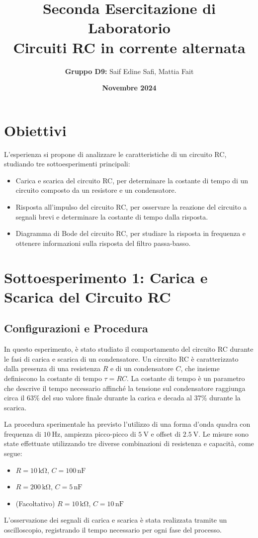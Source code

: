 \documentclass[a4paper,12pt]{article}
\title{\Large\textbf{Seconda Esercitazione di Laboratorio}\\ \vspace{0.5em} \large Circuiti RC in corrente alternata}
\author{\textbf{Gruppo D9:} Saif Edine Safi, Mattia Fait}
\date{\textbf{Novembre 2024}}
\begin{document}
\maketitle

\tableofcontents %
\newpage

\section{Obiettivi}
L'esperienza si propone di analizzare le caratteristiche di un circuito RC, studiando tre sottoesperimenti principali:
\begin{itemize}
    \item Carica e scarica del circuito RC, per determinare la costante di tempo di un circuito composto da un resistore e un condensatore.
    \item Risposta all'impulso del circuito RC, per osservare la reazione del circuito a segnali brevi e determinare la costante di tempo dalla risposta.
    \item Diagramma di Bode del circuito RC, per studiare la risposta in frequenza e ottenere informazioni sulla risposta del filtro passa-basso.
\end{itemize}


\section{Sottoesperimento 1: Carica e Scarica del Circuito RC}
\subsection{Configurazioni e Procedura}
In questo esperimento, è stato studiato il comportamento del circuito RC durante le fasi di carica e scarica di un condensatore. Un circuito RC è caratterizzato dalla presenza di una resistenza \( R \) e di un condensatore \( C \), che insieme definiscono la costante di tempo \(\tau = RC\). La costante di tempo è un parametro che descrive il tempo necessario affinché la tensione sul condensatore raggiunga circa il 63\% del suo valore finale durante la carica e decada al 37\% durante la scarica.

La procedura sperimentale ha previsto l'utilizzo di una forma d'onda quadra con frequenza di \(\SI{10}{\hertz}\), ampiezza picco-picco di \(\SI{5}{\volt}\) e offset di \(\SI{2.5}{\volt}\). Le misure sono state effettuate utilizzando tre diverse combinazioni di resistenza e capacità, come segue:
\begin{itemize}
    \item \( R = 10 \, \mathrm{k\Omega} \), \( C = 100 \, \mathrm{nF} \)
    \item \( R = 200 \, \mathrm{k\Omega} \), \( C = 5 \, \mathrm{nF} \)
    \item (Facoltativo) \( R = 10 \, \mathrm{k\Omega} \), \( C = 10 \, \mathrm{nF} \)
\end{itemize}
L'osservazione dei segnali di carica e scarica è stata realizzata tramite un oscilloscopio, registrando il tempo necessario per ogni fase del processo.
\end{document}
